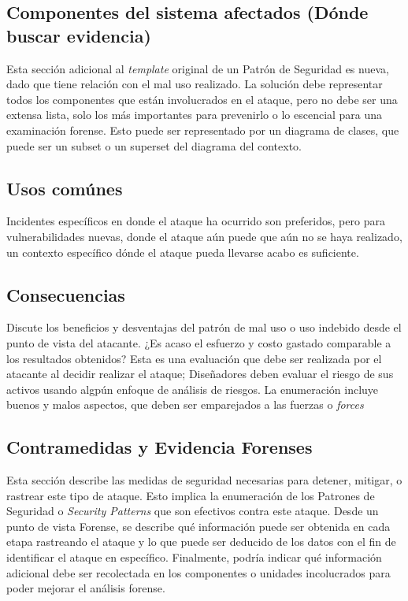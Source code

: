 \subsection*{Componentes del sistema afectados (Dónde buscar evidencia)}
Esta sección adicional al \textit{template} original de un Patrón de Seguridad \cite{fernandez2013security} es nueva, dado que tiene relación con el mal uso realizado. La solución debe representar todos los componentes que están involucrados en el ataque, pero no debe ser una extensa lista, solo los más importantes para prevenirlo o lo escencial para una examinación forense. Esto puede ser representado por un diagrama de clases, que puede ser un subset o un superset del diagrama del contexto.

\subsection*{Usos comúnes}
Incidentes específicos en donde el ataque ha ocurrido son preferidos, pero para vulnerabilidades nuevas, donde el ataque aún puede que aún no se haya realizado, un contexto específico dónde el ataque pueda llevarse acabo es suficiente.

\subsection*{Consecuencias}
Discute los beneficios y desventajas del patrón de mal uso o uso indebido desde el punto de vista del atacante. ¿Es acaso el esfuerzo y costo gastado comparable a los resultados obtenidos? Esta es una evaluación que debe ser realizada por el atacante al decidir realizar el ataque; Diseñadores deben evaluar el riesgo de sus activos usando algpún enfoque de análisis de riesgos. La enumeración incluye buenos y malos aspectos, que deben ser emparejados a las fuerzas o \textit{forces}


\subsection*{Contramedidas y Evidencia Forenses}
Esta sección describe las medidas de seguridad necesarias para detener, mitigar, o rastrear este tipo de ataque. Esto implica la enumeración de los Patrones de Seguridad o \textit{Security Patterns} que son efectivos contra este ataque. Desde un punto de vista Forense, se describe qué información puede ser obtenida en cada etapa rastreando el ataque y lo que puede ser deducido de los datos con el fin de identificar el ataque en específico. Finalmente, podría indicar qué información adicional debe ser recolectada en los componentes o unidades incolucrados para poder mejorar el análisis forense.

